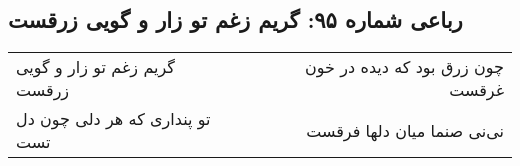 \begin{center}
\section*{رباعی شماره ۹۵: گریم زغم تو زار و گویی زرقست}
\label{sec:sh095}
\begin{longtable}{l p{0.5cm} r}
گریم زغم تو زار و گویی زرقست
&&
چون زرق بود که دیده در خون غرقست
\\
تو پنداری که هر دلی چون دل تست
&&
نی‌نی صنما میان دلها فرقست
\\
\end{longtable}
\end{center}
